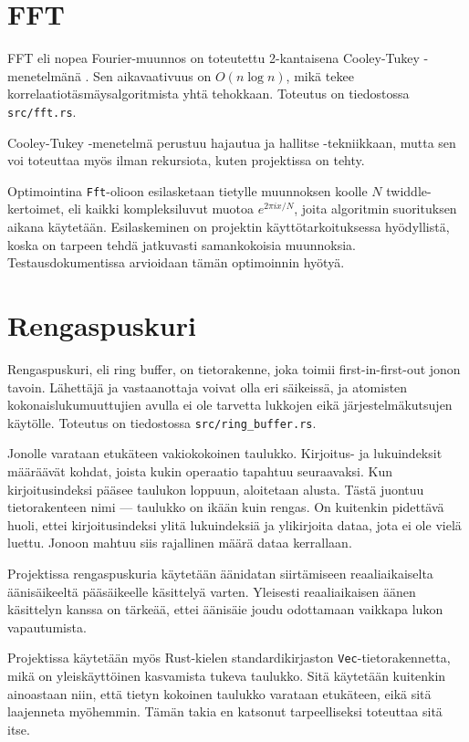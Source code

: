\documentclass[11pt,oneside,a4paper]{memoir}
\begin{document}
\section*{FFT}

FFT eli nopea Fourier-muunnos on toteutettu 2-kantaisena Cooley-Tukey -menetelmänä \cite{fft}.
Sen aikavaativuus on $O(n \log n)$, mikä tekee korrelaatiotäsmäysalgoritmista yhtä
tehokkaan.
Toteutus on tiedostossa \texttt{src/fft.rs}.

Cooley-Tukey -menetelmä perustuu hajautua ja hallitse -tekniikkaan, mutta sen voi
toteuttaa myös ilman rekursiota, kuten projektissa on tehty.

Optimointina \texttt{Fft}-olioon esilasketaan tietylle muunnoksen koolle $N$
twiddle-kertoimet, eli kaikki kompleksiluvut muotoa $e^{2\pi i x / N}$, joita algoritmin
suorituksen aikana käytetään. Esilaskeminen on projektin käyttötarkoituksessa
hyödyllistä, koska on tarpeen tehdä jatkuvasti samankokoisia muunnoksia.
Testausdokumentissa arvioidaan tämän optimoinnin hyötyä.

\section*{Rengaspuskuri}

Rengaspuskuri, eli ring buffer, on tietorakenne, joka toimii first-in-first-out
jonon tavoin. Lähettäjä ja vastaanottaja voivat olla eri säikeissä, ja atomisten
kokonaislukumuuttujien avulla ei ole tarvetta lukkojen eikä järjestelmäkutsujen
käytölle. Toteutus on tiedostossa \texttt{src/ring\_buffer.rs}.

Jonolle varataan etukäteen vakiokokoinen taulukko. Kirjoitus- ja lukuindeksit
määräävät kohdat, joista kukin operaatio tapahtuu seuraavaksi. Kun kirjoitusindeksi pääsee
taulukon loppuun, aloitetaan alusta. Tästä juontuu tietorakenteen nimi --- taulukko
on ikään kuin rengas. On kuitenkin pidettävä huoli, ettei kirjoitusindeksi ylitä
lukuindeksiä ja ylikirjoita dataa, jota ei ole vielä luettu. Jonoon mahtuu siis rajallinen
määrä dataa kerrallaan.

Projektissa rengaspuskuria käytetään äänidatan siirtämiseen reaaliaikaiselta äänisäikeeltä
pääsäikeelle käsittelyä varten. Yleisesti reaaliaikaisen äänen käsittelyn kanssa on tärkeää,
ettei äänisäie joudu odottamaan vaikkapa lukon vapautumista.

Projektissa käytetään myös Rust-kielen standardikirjaston \texttt{Vec}-tietorakennetta,
mikä on yleiskäyttöinen kasvamista tukeva taulukko. Sitä käytetään kuitenkin ainoastaan
niin, että tietyn kokoinen taulukko varataan etukäteen, eikä sitä laajenneta myöhemmin.
Tämän takia en katsonut tarpeelliseksi toteuttaa sitä itse.
\end{document}
